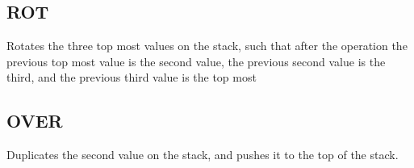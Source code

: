 \subsection{ROT}
\label{sec:rot}
Rotates the three top most values on the stack, such that after the
operation the previous top most value is the second value, the previous
second value is the third, and the previous third value is the top most

\subsection{OVER}
\label{sec:over}
Duplicates the second value on the stack, and pushes it to the top of
the stack.
